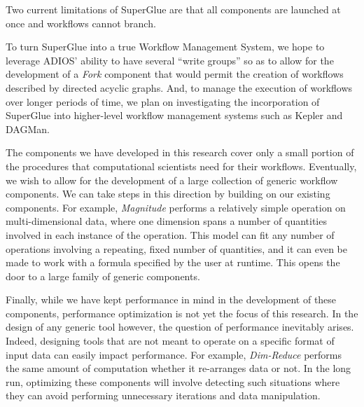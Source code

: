 Two current limitations of SuperGlue are
that 
all components are launched at once and
workflows cannot branch.

To turn SuperGlue into a true Workflow Management
System, we hope to leverage
ADIOS' ability to have several ``write groups''
so as to allow for the development
of a {\em Fork} component
that would permit
the creation of workflows
described by directed acyclic graphs.
And, to manage the execution of workflows
over longer periods of time,
we plan on investigating
the incorporation of SuperGlue into
higher-level workflow management systems
such as Kepler and DAGMan.

The components we have developed in this research cover only a small portion of
the procedures that computational scientists need for their
workflows. Eventually, we wish to allow for the development of a large
collection of generic workflow components. We can take steps in this direction
by building on our existing components. For example, {\em Magnitude} performs a
relatively simple operation on multi-dimensional data, where one dimension
spans a number of quantities involved in each instance of the operation. This
model can fit any number of operations involving a repeating, fixed number of
quantities, and it can even be made to work with a formula specified by the
user at runtime. This opens the door to a large family of generic components.

Finally, while we have kept performance in mind in the development of these
components, performance optimization is not yet the focus of this research. In
the design of any generic tool however, the question of performance inevitably
arises. Indeed, designing tools that are not meant to operate on a specific
format of input data can easily impact performance. For example, {\em
Dim-Reduce} performs the same amount of computation whether it re-arranges data
or not. In the long run, optimizing these components will involve detecting
such situations where they can avoid performing unnecessary iterations and data
manipulation.
\fi
